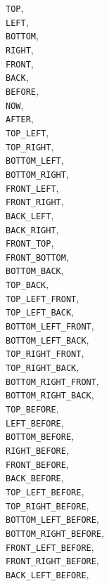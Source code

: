 \documentclass[10pt]{article}
\begin{document}
	\verb+TOP+,\\
	\verb+LEFT+,\\
	\verb+BOTTOM+,\\
	\verb+RIGHT+,\\
	\verb+FRONT+,\\
	\verb+BACK+,\\
	\verb+BEFORE+,\\
	\verb+NOW+,\\
	\verb+AFTER+,\\
	\verb+TOP_LEFT+,\\
	\verb+TOP_RIGHT+,\\
	\verb+BOTTOM_LEFT+,\\
	\verb+BOTTOM_RIGHT+,\\
	\verb+FRONT_LEFT+,\\
	\verb+FRONT_RIGHT+,\\
	\verb+BACK_LEFT+,\\
	\verb+BACK_RIGHT+,\\
	\verb+FRONT_TOP+,\\
	\verb+FRONT_BOTTOM+,\\
	\verb+BOTTOM_BACK+,\\
	\verb+TOP_BACK+,\\
	\verb+TOP_LEFT_FRONT+,\\
	\verb+TOP_LEFT_BACK+,\\
	\verb+BOTTOM_LEFT_FRONT+,\\
	\verb+BOTTOM_LEFT_BACK+,\\
	\verb+TOP_RIGHT_FRONT+,\\
	\verb+TOP_RIGHT_BACK+,\\
	\verb+BOTTOM_RIGHT_FRONT+,\\
	\verb+BOTTOM_RIGHT_BACK+,\\
	\verb+TOP_BEFORE+,\\
	\verb+LEFT_BEFORE+,\\
	\verb+BOTTOM_BEFORE+,\\
	\verb+RIGHT_BEFORE+,\\
	\verb+FRONT_BEFORE+,\\
	\verb+BACK_BEFORE+,\\
	\verb+TOP_LEFT_BEFORE+,\\
	\verb+TOP_RIGHT_BEFORE+,\\
	\verb+BOTTOM_LEFT_BEFORE+,\\
	\verb+BOTTOM_RIGHT_BEFORE+,\\
	\verb+FRONT_LEFT_BEFORE+,\\
	\verb+FRONT_RIGHT_BEFORE+,\\
	\verb+BACK_LEFT_BEFORE+,\\
\end{document}
